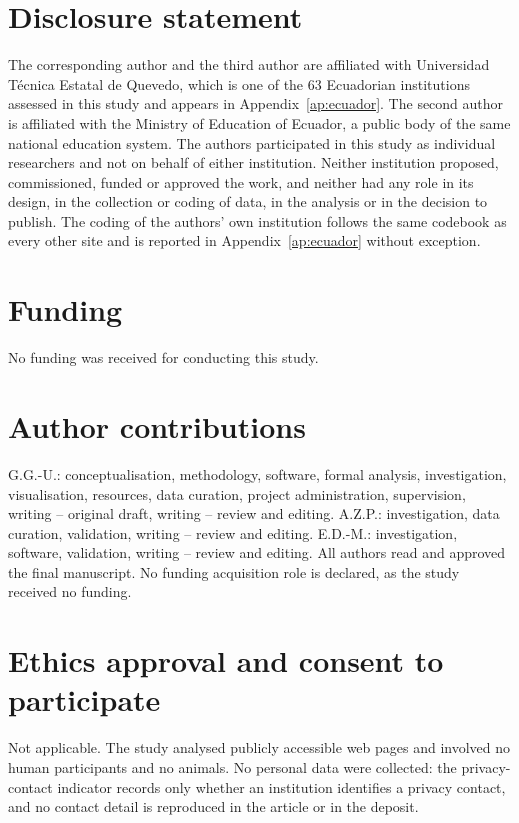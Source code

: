 \documentclass[]{interact}
\begin{document}
\section*{Disclosure statement}
The corresponding author and the third author are affiliated with Universidad T\'ecnica Estatal de Quevedo, which is one of the 63 Ecuadorian institutions assessed in this study and appears in Appendix~\ref{ap:ecuador}. The second author is affiliated with the Ministry of Education of Ecuador, a public body of the same national education system. The authors participated in this study as individual researchers and not on behalf of either institution. Neither institution proposed, commissioned, funded or approved the work, and neither had any role in its design, in the collection or coding of data, in the analysis or in the decision to publish. The coding of the authors' own institution follows the same codebook as every other site and is reported in Appendix~\ref{ap:ecuador} without exception.

\section*{Funding}
No funding was received for conducting this study.

\section*{Author contributions}
G.G.-U.: conceptualisation, methodology, software, formal analysis, investigation, visualisation, resources, data curation, project administration, supervision, writing -- original draft, writing -- review and editing. A.Z.P.: investigation, data curation, validation, writing -- review and editing. E.D.-M.: investigation, software, validation, writing -- review and editing. All authors read and approved the final manuscript. No funding acquisition role is declared, as the study received no funding.

\section*{Ethics approval and consent to participate}
Not applicable. The study analysed publicly accessible web pages and involved no human participants and no animals. No personal data were collected: the privacy-contact indicator records only whether an institution identifies a privacy contact, and no contact detail is reproduced in the article or in the deposit.
\end{document}
